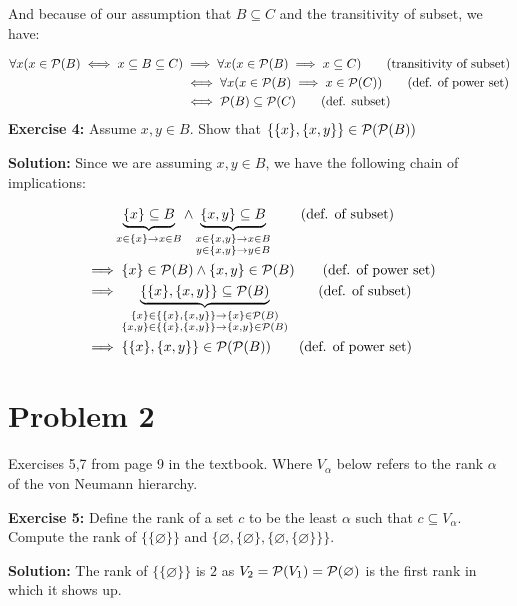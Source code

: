 \documentclass{article}
\begin{document}
And because of our assumption that $B\subseteq C$ and the transitivity of subset, we have:

\begin{align*}
    \forall x(x\in\mathcal P(B)\iff x\subseteq B\subseteq C)&\implies\forall x(x\in\mathcal P(B)\implies x\subseteq C)\tag{transitivity of subset}\\
    &\iff\forall x(x\in\mathcal P(B)\implies x\in\mathcal P(C))\tag{def. of power set}\\
    &\iff\mathcal P(B)\subseteq\mathcal P(C)\tag{def. subset}
\end{align*}
\bigskip
\noindent\textbf{Exercise 4:} Assume $x,y\in B$. Show that $\{\{x\},\{x,y\}\}\in\mathcal P(\mathcal P(B))$
\bigskip

\noindent\textbf{Solution:} Since we are assuming $x,y\in B$, we have the following chain of implications:

\begin{align*}
    &\phantom{\implies}\underbrace{\{x\}\subseteq B}_{x\in\{x\}\rightarrow x\in B} \wedge\underbrace{\{x,y\}\subseteq B}_{\substack{x\in\{x,y\}\rightarrow x\in B\\y\in\{x,y\}\rightarrow y\in B}}\tag{def. of subset}\\
    &\implies \{x\}\in\mathcal P(B)\wedge\{x,y\}\in\mathcal P(B)\tag{def. of power set}\\
    &\implies \underbrace{\{\{x\},\{x,y\}\}\subseteq \mathcal P(B)}_{\substack{\{x\}\in\{\{x\},\{x,y\}\}\rightarrow \{x\}\in\mathcal P(B)\\\{x,y\}\in\{\{x\},\{x,y\}\}\rightarrow \{x,y\}\in\mathcal P(B)}}\tag{def. of subset}\\
    &\implies\{\{x\},\{x,y\}\}\in\mathcal P(\mathcal P(B))\tag{def. of power set}
\end{align*}

\section*{Problem 2}
Exercises 5,7 from page 9 in the textbook. Where $V_\alpha$ below refers to the rank $\alpha$ of the von Neumann hierarchy.
\bigskip

\noindent\textbf{Exercise 5:} Define the rank of a set $c$ to be the least $\alpha$ such that $c\subseteq V_\alpha$. Compute the rank of $\{\{\varnothing\}\}$ and $\{\varnothing, \{\varnothing\}, \{\varnothing, \{\varnothing\}\}\}$.
\bigskip

\noindent\textbf{Solution:} The rank of $\{\{\varnothing\}\}$ is $2$ as $V_2=\mathcal P(V_1)=\mathcal P(\varnothing)$ is the first rank in which it shows up.
\end{document}
